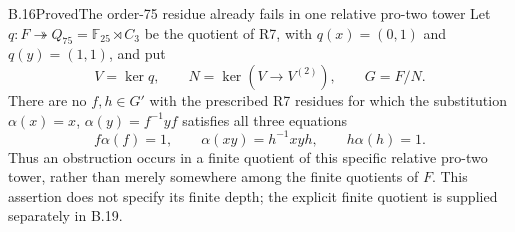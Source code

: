 \begin{statement}{B.16}{Proved}{The order-75 residue already fails in one relative pro-two tower}
Let $q:F\twoheadrightarrow Q_{75}=\mathbb F_{25}\rtimes C_3$
be the quotient of R7, with
$q(x)=(0,1)$ and $q(y)=(1,1)$, and put
\[
 V=\ker q,\qquad N=\ker(V\longrightarrow V^{(2)}),
 \qquad G=F/N.
\]
There are no $f,h\in G'$ with the prescribed R7 residues for
which the substitution $\alpha(x)=x$, $\alpha(y)=f^{-1}yf$
satisfies all three equations
\[
 f\alpha(f)=1,\qquad
 \alpha(xy)=h^{-1}xyh,\qquad h\alpha(h)=1.
\]
Thus an obstruction occurs in a finite quotient of this specific
relative pro-two tower, rather than merely somewhere among the
finite quotients of $F$. This assertion does not specify its finite
depth; the explicit finite quotient is supplied separately in B.19.
\end{statement}
